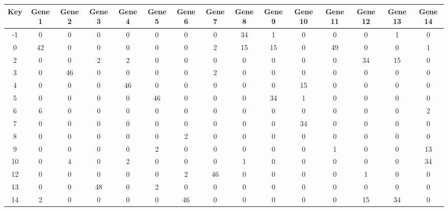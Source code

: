 \begin{tabular}{|c|c|c|c|c|c|c|c|c|c|c|c|c|c|c|}
\hline
Key & Gene 1 & Gene 2 & Gene 3 & Gene 4 & Gene 5 & Gene 6 & Gene 7 & Gene 8 & Gene 9 & Gene 10 & Gene 11 & Gene 12 & Gene 13 & Gene 14 \\
\hline
-1 & 0 & 0 & 0 & 0 & 0 & 0 & 0 & 34 & 1 & 0 & 0 & 0 & 1 & 0 \\
0 & 42 & 0 & 0 & 0 & 0 & 0 & 2 & 15 & 15 & 0 & 49 & 0 & 0 & 1 \\
2 & 0 & 0 & 2 & 2 & 0 & 0 & 0 & 0 & 0 & 0 & 0 & 34 & 15 & 0 \\
3 & 0 & 46 & 0 & 0 & 0 & 0 & 2 & 0 & 0 & 0 & 0 & 0 & 0 & 0 \\
4 & 0 & 0 & 0 & 46 & 0 & 0 & 0 & 0 & 0 & 15 & 0 & 0 & 0 & 0 \\
5 & 0 & 0 & 0 & 0 & 46 & 0 & 0 & 0 & 34 & 1 & 0 & 0 & 0 & 0 \\
6 & 6 & 0 & 0 & 0 & 0 & 0 & 0 & 0 & 0 & 0 & 0 & 0 & 0 & 2 \\
7 & 0 & 0 & 0 & 0 & 0 & 0 & 0 & 0 & 0 & 34 & 0 & 0 & 0 & 0 \\
8 & 0 & 0 & 0 & 0 & 0 & 2 & 0 & 0 & 0 & 0 & 0 & 0 & 0 & 0 \\
9 & 0 & 0 & 0 & 0 & 2 & 0 & 0 & 0 & 0 & 0 & 1 & 0 & 0 & 13 \\
10 & 0 & 4 & 0 & 2 & 0 & 0 & 0 & 1 & 0 & 0 & 0 & 0 & 0 & 34 \\
12 & 0 & 0 & 0 & 0 & 0 & 2 & 46 & 0 & 0 & 0 & 0 & 1 & 0 & 0 \\
13 & 0 & 0 & 48 & 0 & 2 & 0 & 0 & 0 & 0 & 0 & 0 & 0 & 0 & 0 \\
14 & 2 & 0 & 0 & 0 & 0 & 46 & 0 & 0 & 0 & 0 & 0 & 15 & 34 & 0 \\
\hline
\end{tabular}